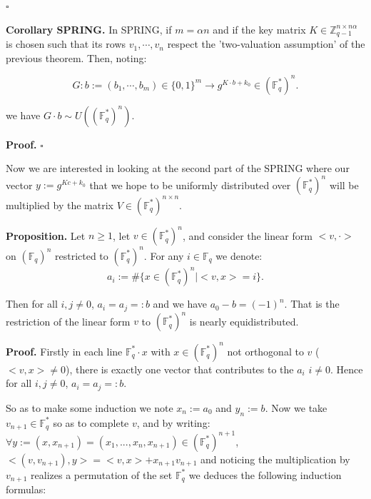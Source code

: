 \documentclass{article}
\begin{document}
\hfill $\square$

\vspace{0.3cm}

\textbf{Corollary SPRING.}
In SPRING, if $m=\alpha n$ and if the key matrix  $K \in \mathbb{Z}_{q-1}^{n \times n \alpha}$ is chosen such that its rows $v_1,\cdots,v_n$ respect the 'two-valuation assumption' of the previous theorem. Then, noting:

\[
 G: b:=(b_1,\cdots,b_m) \in \{0,1\}^m \to g^{K \cdot b + k_0} \in (\mathbb{F}_q^*)^n.
\]

we have $G \cdot b \sim U((\mathbb{F}_q^*)^n)$.

\vspace{0.3cm}

\textbf{Proof.} \hfill $\square$

\vspace{0.3cm}
Now we are interested in looking at the second part of the SPRING where our vector $y:=g^{Kc+k_0}$ that we hope to be uniformly distributed over $(\mathbb{F}_q^*)^n$ will be multiplied by the matrix $V \in (\mathbb{F}_q^*)^{n \times n}$.

\vspace{0.3cm}

\textbf{Proposition.}
Let $n \geq 1$, let $v \in (\mathbb{F}_q^*)^n$, and consider the linear form $<v,\cdot>$ on $(\mathbb{F}_q)^n$ restricted to $(\mathbb{F}_q^*)^n$. For any $i \in \mathbb{F}_q$ we denote:
\[
a_i:= \#\{x \in (\mathbb{F}_q^*)^n \mid <v,x>=i\}.
\]

Then for all $i,j \neq 0$, $a_i = a_j=:b$ and we have $a_0 - b = (-1)^n$. That is the restriction of the linear form $v$ to $(\mathbb{F}_q^*)^n$ is nearly equidistributed.

\vspace{0.3cm}

\textbf{Proof.}
Firstly in each line $\mathbb{F}_q^* \cdot x$ with $x \in (\mathbb{F}_q^*)^n$ not orthogonal to $v$ ($<v,x> \neq 0$), there is exactly one vector that contributes to the $a_i$ $i\neq0$. Hence for all $i, j \neq 0$, $a_i = a_j =:b$.

\vspace{0.3cm}

So as to make some induction we note $x_n:=a_0$ and $y_n:=b$. Now we take $v_{n+1} \in \mathbb{F}_q^*$ so as to complete $v$, and by writing: $\forall y:=(x,x_{n+1})=(x_1,...,x_n,x_{n+1}) \in (\mathbb{F}_q^*)^{n+1}$, $<(v,v_{n+1}),y> = <v,x> + x_{n+1}v_{n+1}$ and noticing the multiplication by $v_{n+1}$ realizes a permutation of the set $\mathbb{F}_q^*$ we deduces the following induction formulas:
\end{document}
